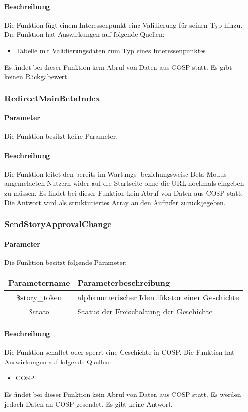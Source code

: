 \paragraph{Beschreibung} Die Funktion fügt einem Interessenpunkt eine Validierung für seinen Typ hinzu. Die Funktion hat Auswirkungen auf folgende Quellen:
\begin{itemize}
	\item Tabelle mit Validierungsdaten zum Typ eines Interessenpunktes
\end{itemize}
Es findet bei dieser Funktion kein Abruf von Daten aus {\glqq COSP\grqq} statt. Es gibt keinen Rückgabewert.
\subsubsection{RedirectMainBetaIndex}
\paragraph{Parameter} Die Funktion besitzt keine Parameter.
\paragraph{Beschreibung} Die Funktion leitet den bereits im Wartungs- beziehungsweise Beta-Modus angemeldeten Nutzern wider auf die Startseite ohne die URL nochmals eingeben zu müssen. Es findet bei dieser Funktion kein Abruf von Daten aus {\glqq COSP\grqq} statt. Die Antwort wird als strukturiertes Array an den Aufrufer zurückgegeben.
\subsubsection{SendStoryApprovalChange}
\paragraph{Parameter} Die Funktion besitzt folgende Parameter:
\begin{table}[H]
	\begin{tabular}{|c|p{11cm}|}
		\hline
		\textbf{Parametername} & \textbf{Parameterbeschreibung} \\ \hline
		\$story\_token & alphanumerischer Identifikator einer Geschichte \\ \hline
		\$state        & Status der Freischaltung der Geschichte \\ \hline
	\end{tabular}
\end{table}
\paragraph{Beschreibung} Die Funktion schaltet oder sperrt eine Geschichte in {\glqq COSP\grqq}. Die Funktion hat Auswirkungen auf folgende Quellen:
\begin{itemize}
	\item COSP
\end{itemize}
Es findet bei dieser Funktion kein Abruf von Daten aus {\glqq COSP\grqq} statt. Es werden jedoch Daten an {\glqq COSP\grqq} gesendet. Es gibt keine Antwort.
